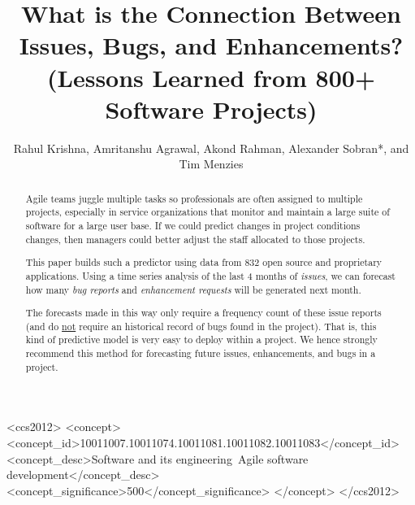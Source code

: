 \documentclass[sigconf, preprint]{acmart}
\begin{document}
\title{What is the Connection Between Issues, Bugs, and Enhancements?
(Lessons Learned
from
800+ Software Projects)}
\author{
Rahul Krishna, Amritanshu Agrawal, Akond Rahman, 
Alexander Sobran*, and Tim Menzies}






\begin{abstract}
Agile teams juggle multiple tasks so professionals are often assigned to multiple projects, especially in service organizations that monitor and maintain a large suite of software for a large user base. 
If we could predict changes in
project conditions
changes, then managers could  better adjust the
staff allocated to those projects.

This paper builds such a predictor using data from  832  open source and 
proprietary applications. Using a time series analysis of the   last 4 months
of {\em issues}, we can forecast how many {\em bug reports} and \textit{enhancement requests} will be generated  next month. 

The forecasts made in this way only require a frequency count of these issue 
reports  (and do \underline{not} require an historical record of bugs found in 
the project). That is, this kind of predictive model is very easy to deploy 
within a project. We hence strongly recommend this method for forecasting 
future issues, enhancements, and bugs in a project. 
\end{abstract}




\begin{CCSXML}
<ccs2012>
<concept>
<concept_id>10011007.10011074.10011081.10011082.10011083</concept_id>
<concept_desc>Software and its engineering~Agile software 
development</concept_desc>
<concept_significance>500</concept_significance>
</concept>
</ccs2012>
\end{CCSXML}



\end{document}
